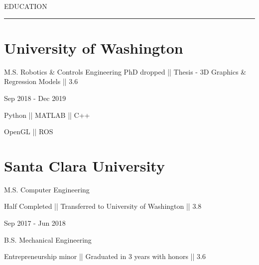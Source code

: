 
{
\hspace{-1.72in}\noindent\color{cblue}
{EDUCATION} %
}

\vspace{-1.6ex}
{\hspace{-1.73in}\noindent\color{dblue}\rule{6.935in}{0.4pt}} %
\vspace{-5ex}


\section
{\textbf{University of Washington}}{}

{\small M.S. Robotics \& Controls Engineering}
\BulletItem
{\small PhD dropped || Thesis - 3D Graphics \& Regression Models || 3.6}

\begin{subtitle}
\vspace{-8ex}
{{Sep 2018 - Dec 2019}}
\end{subtitle}

\vspace{-1ex}

{
\vspace{1.4ex}
\color{cyan}\small
{Python || MATLAB || C++} %
}

{
\vspace{-2.5ex}\hspace{3.17in}
\color{cyan}\small
{OpenGL || ROS} %
}
\vspace{-2.5ex}


\section
{\textbf{Santa Clara University}}{}{}

{{\small M.S. Computer Engineering }}
\begin{detail}
\BulletItem
Half Completed || Transferred to University of Washington || 3.8
\end{detail}

\begin{subtitle}
\vspace{-8ex}
{{Sep 2017 - Jun 2018}}
\end{subtitle}

\vspace{1ex}

{{\small B.S. Mechanical Engineering}}
\begin{detail}
\BulletItem
Entrepreneurship minor || Graduated in 3 years with honors || 3.6
\end{detail}

